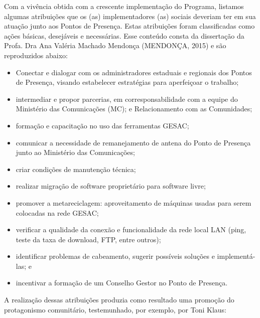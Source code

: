 Com a vivência obtida com a crescente implementação do Programa, listamos  algumas atribuições que os (as) implementadores (as) sociais deveriam ter em sua atuação junto aos Pontos de Presença. Estas atribuições foram classificadas como ações básicas, desejáveis e necessárias. Esse conteúdo consta da dissertação da Profa. Dra Ana Valéria Machado Mendonça  (MENDONÇA, 2015) e são reproduzidos abaixo:


\begin{itemize}
\item Conectar e dialogar com os administradores estaduais e regionais dos Pontos de Presença, visando estabelecer estratégias para aperfeiçoar o trabalho;
\item intermediar e propor parcerias, em corresponsabilidade com a equipe do Ministério das Comunicações (MC); e Relacionamento com as Comunidades;
\item formação e capacitação no uso das ferramentas GESAC;
\item comunicar a  necessidade de remanejamento de antena  do Ponto de Presença junto ao Ministério das Comunicações;
\item criar condições de manutenção técnica;
\item realizar migração de software proprietário para software livre;
\item promover a metareciclagem: aproveitamento de máquinas usadas para serem colocadas na rede GESAC;
\item verificar a qualidade da conexão e  funcionalidade da rede local LAN (ping, teste da taxa de download, FTP, entre outros);
\item identificar problemas de cabeamento, sugerir possíveis soluções e implementá-las; e
\item incentivar a formação de um Conselho Gestor no Ponto de Presença.
\end{itemize}

A realização dessas atribuições produzia como resultado uma promoção do protagonismo comunitário, testemunhado, por exemplo, por Toni Klaus:


\noindent\begin{flushright}\mbox{\linespread{1}\selectfont\centering{}}\end{flushright}


